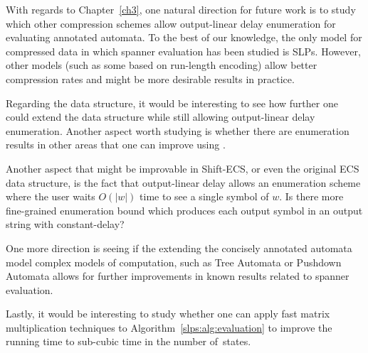 
With regards to Chapter~\ref{ch3}, one natural direction for future work is to study which other compression schemes allow output-linear delay enumeration for evaluating annotated automata. To the best of our knowledge, the only model for compressed data in which spanner evaluation has been studied is SLPs. However, other models (such as some based on run-length encoding) allow better compression rates and might be more desirable results in practice.

Regarding the \dsabbr data structure, it would be interesting to see how further one could extend the data structure while still allowing output-linear delay enumeration. Another aspect worth studying is whether there are enumeration results in other areas that one can improve using \dsabbr.

Another aspect that might be improvable in Shift-ECS, or even the original ECS data structure, is the fact that output-linear delay allows an enumeration scheme where the user waits $O(|w|)$ time to see a single symbol of $w$. Is there more fine-grained enumeration bound which produces each output symbol in an output string with constant-delay?

One more direction is seeing if the extending the concisely annotated automata model complex models of computation, such as Tree Automata or Pushdown Automata allows for further improvements in known results related to spanner evaluation.  

Lastly, it would be interesting to study whether one can apply fast matrix multiplication techniques to Algorithm~\ref{slps:alg:evaluation} to improve the running time to sub-cubic time in the number of~states.